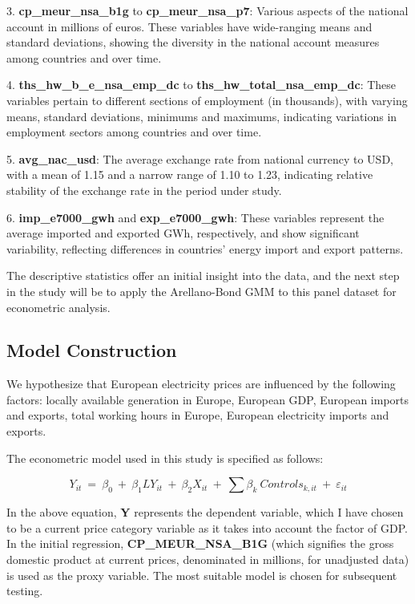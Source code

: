 \documentclass[12pt]{article}
\begin{document}
3.	\textbf{cp\_meur\_nsa\_b1g} to \textbf{cp\_meur\_nsa\_p7}: Various aspects of the national account in millions of euros. These variables have wide-ranging means and standard deviations, showing the diversity in the national account measures among countries and over time.

4.	\textbf{ths\_hw\_b\_e\_nsa\_emp\_dc} to \textbf{ths\_hw\_total\_nsa\_emp\_dc}: These variables pertain to different sections of employment (in thousands), with varying means, standard deviations, minimums and maximums, indicating variations in employment sectors among countries and over time.

5.	\textbf{avg\_nac\_usd}: The average exchange rate from national currency to USD, with a mean of 1.15 and a narrow range of 1.10 to 1.23, indicating relative stability of the exchange rate in the period under study.

6.	\textbf{imp\_e7000\_gwh} and \textbf{exp\_e7000\_gwh}: These variables represent the average imported and exported GWh, respectively, and show significant variability, reflecting differences in countries' energy import and export patterns.

The descriptive statistics offer an initial insight into the data, and the next step in the study will be to apply the Arellano-Bond GMM to this panel dataset for econometric analysis. 

\subsection{Model Construction}
We hypothesize that European electricity prices are influenced by the following factors: locally available generation in Europe, European GDP, European imports and exports, total working hours in Europe, European electricity imports and exports.

The econometric model used in this study is specified as follows:

\begin{equation} Y_{it}\ =\ \beta_0\ +\ \beta_1{LY}_{it}\ +\ \beta_2X_{it}\ +\ \sum{\beta_k\ {Controls}_{k,it}}\ +\ \varepsilon_{it} \end{equation}

In the above equation, \textbf{Y} represents the dependent variable, which I have chosen to be a current price category variable as it takes into account the factor of GDP. In the initial regression, \textbf{CP\_MEUR\_NSA\_B1G} (which signifies the gross domestic product at current prices, denominated in millions, for unadjusted data) is used as the proxy variable. The most suitable model is chosen for subsequent testing.
\end{document}
